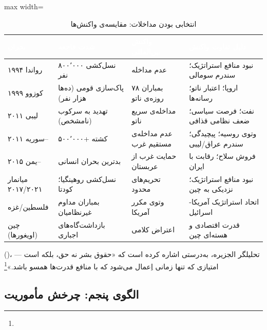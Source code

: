 {\begin{table}[htbp]
\centering
\caption{انتخابی بودن مداخلات: مقایسه‌ی واکنش‌ها}
\label{tab:ch10-selectivity}
\begin{adjustbox}{max width=\linewidth}
\begin{tabularx}{\linewidth}{>{\raggedleft\arraybackslash}p{2.5cm} >{\raggedleft\arraybackslash}p{3cm} >{\raggedleft\arraybackslash}p{3cm} >{\raggedleft\arraybackslash}X}
\toprule
\rowcolor{PrimaryDeep}
\textcolor{white}{\textbf{بحران}} &
\textcolor{white}{\textbf{شدت فاجعه}} &
\textcolor{white}{\textbf{واکنش بین‌المللی}} &
\textcolor{white}{\textbf{دلیل تفاوت واکنش}} \\
\midrule
رواندا ۱۹۹۴ & نسل‌کشی ۸۰۰٬۰۰۰ نفر & عدم مداخله & نبود منافع استراتژیک؛ سندرم سومالی \\
\rowcolor{NeutralLight}
کوزوو ۱۹۹۹ & پاک‌سازی قومی (ده‌ها هزار نفر) & بمباران ۷۸ روزه‌ی ناتو & اروپا؛ اعتبار ناتو؛ رسانه‌ها \\
لیبی ۲۰۱۱ & تهدید به سرکوب (نامشخص) & مداخله‌ی سریع ناتو & نفت؛ فرصت سیاسی؛ ضعف نظامی قذافی \\
\rowcolor{NeutralLight}
سوریه ۲۰۱۱– & ۵۰۰٬۰۰۰+ کشته & عدم مداخله‌ی مستقیم غرب & وتوی روسیه؛ پیچیدگی؛ سندرم عراق/لیبی \\
یمن ۲۰۱۵– & بدترین بحران انسانی & حمایت غرب از عربستان & فروش سلاح؛ رقابت با ایران \\
\rowcolor{NeutralLight}
میانمار ۲۰۱۷/۲۰۲۱ & نسل‌کشی روهینگیا؛ کودتا & تحریم‌های محدود & نبود منافع استراتژیک؛ نزدیکی به چین \\
فلسطین/غزه & بمباران مداوم غیرنظامیان & وتوی مکرر آمریکا & اتحاد استراتژیک آمریکا-اسرائیل \\
\rowcolor{NeutralLight}
چین (اویغورها) & بازداشت‌گاه‌های اجباری & اعتراض کلامی & قدرت اقتصادی و هسته‌ای چین \\
\bottomrule
\end{tabularx}
\end{adjustbox}
\end{table}

 ()، تحلیلگر الجزیره، به‌درستی اشاره کرده است که «حقوق بشر نه حق، بلکه  است — امتیازی که تنها زمانی اِعمال می‌شود که با منافع قدرت‌ها همسو باشد.»\footnote{}

\subsection{الگوی پنجم: چرخش مأموریت}
\label{subsec:ch10-mission-creep}

}
